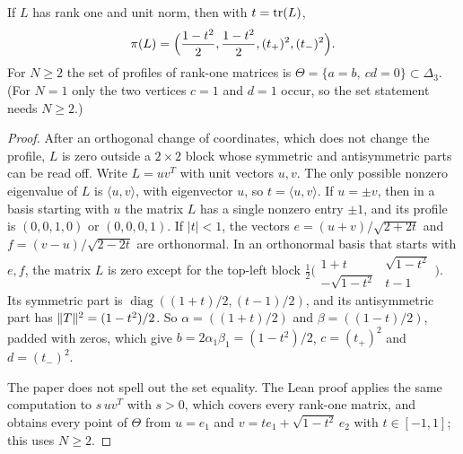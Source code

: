 \setcounter{proposition}{3}
\begin{proposition}
\label{prop:rank-one}
\leanok
{}
If $L$ has rank one and unit norm, then with $t=\operatorname{tr}(L)$,
\[
 \pi(L)=\Bigl(\frac{1-t^2}2,\frac{1-t^2}2,(t_+)^2,(t_-)^2\Bigr).
\]
For $N\ge2$ the set of profiles of rank-one matrices is
$\Theta=\{a=b,\ cd=0\}\subset\Delta_3$. (For $N=1$ only the two vertices
$c=1$ and $d=1$ occur, so the set statement needs $N\ge2$.)
\end{proposition}
\begin{proof}
\leanok
{}
After an orthogonal change of coordinates, which does not change the
profile, $L$ is zero outside a $2\times2$ block whose symmetric and
antisymmetric parts can be read off. Write $L=uv^T$ with unit vectors
$u,v$. The only possible nonzero eigenvalue of $L$ is $\langle u,v\rangle$,
with eigenvector $u$, so $t=\langle u,v\rangle$. If $u=\pm v$, then in a
basis starting with $u$ the matrix $L$ has a single nonzero entry $\pm1$,
and its profile is $(0,0,1,0)$ or $(0,0,0,1)$. If $|t|<1$, the vectors
$e=(u+v)/\sqrt{2+2t}$ and $f=(v-u)/\sqrt{2-2t}$ are orthonormal. In an
orthonormal basis that starts with $e,f$, the matrix $L$ is zero except for
the top-left block
$\tfrac12\bigl(\begin{smallmatrix}1+t&\sqrt{1-t^2}\\-\sqrt{1-t^2}&t-1\end{smallmatrix}\bigr)$.
Its symmetric part is $\operatorname{diag}((1+t)/2,(t-1)/2)$, and its
antisymmetric part has $\lVert T\rVert^2=(1-t^2)/2$. So $\alpha=((1+t)/2)$ and
$\beta=((1-t)/2)$, padded with zeros, which give
$b=2\alpha_1\beta_1=(1-t^2)/2$, $c=(t_+)^2$ and $d=(t_-)^2$.

The paper does not spell out the set equality. The Lean proof applies the same
computation to $s\,uv^T$ with $s>0$, which covers every rank-one matrix,
and obtains every point of $\Theta$ from $u=e_1$ and
$v=te_1+\sqrt{1-t^2}\,e_2$ with $t\in[-1,1]$; this uses $N\ge2$.
\end{proof}

